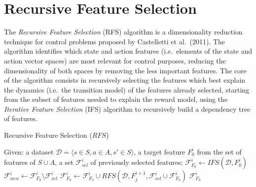 \section{Recursive Feature Selection}
The \textit{Recursive Feature Selection} (RFS) \cite{castelletti2011tree} 
algorithm is a dimensionality reduction technique for control problems proposed
by Castelletti et al.\ (2011). 
The algorithm identifies which state and action features (i.e.\ elements of the 
state and action vector spaces) are most relevant for control purposes, reducing
the dimensionality of both spaces by removing the less important features.
The core of the algorithm consists in recursively selecting the features which 
best explain the dynamics (i.e.\ the transition model) of the features already 
selected, starting from the subset of features needed to explain the reward 
model, using the \textit{Iterative Feature Selection} (IFS) 
\cite{castelletti2013iter} algorithm to recursively build a dependency 
tree of features.
%
\begin{algorithm}
    \caption{Recursive Feature Selection ($RFS$)}
    \label{alg:RFS}
    \begin{algorithmic}
	\STATE Given: a dataset $\mathcal{D} = {\langle s \in S, a \in A, s' \in S \rangle}$, a target feature $F_0^i$ from the set of features of $S \cup A$, a set $\mathcal{F}_{sel}^i$ of previously selected features;
	\STATE $\mathcal{F}_{F_0}^i \leftarrow IFS(\mathcal{D}, F_0^i)$
	\STATE $\mathcal{F}_{new}^i \leftarrow \mathcal{F}_{F_0}^i \setminus \mathcal{F}_{sel}^i$
	    \STATE $\mathcal{F}_{F_0}^i \leftarrow \mathcal{F}_{F_0}^i \cup RFS(\mathcal{D}, F_j^{i+1}, \mathcal{F}_{sel}^i \cup \mathcal{F}_{F_0}^i)$
	\ENDFOR
	\RETURN $\mathcal{F}_{F_0}^i$
    \end{algorithmic}
\end{algorithm}
%


